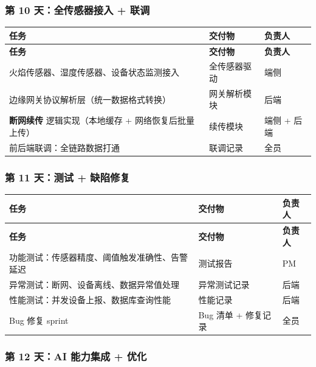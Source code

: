 \documentclass[UTF8,12pt,a4paper]{ctexart}
\begin{document}
\subsubsection{第 10 天：全传感器接入 + 联调}

\begin{longtable}{L{6cm}L{4.5cm}C{2.5cm}}
\toprule
\textbf{任务} & \textbf{交付物} & \textbf{负责人} \\
\midrule
\endfirsthead
\toprule
\textbf{任务} & \textbf{交付物} & \textbf{负责人} \\
\midrule
\endhead
\bottomrule
\endfoot

火焰传感器、湿度传感器、设备状态监测接入 & 全传感器驱动 & 端侧 \\
\midrule
边缘网关协议解析层（统一数据格式转换） & 网关解析模块 & 后端 \\
\midrule
\textbf{断网续传} 逻辑实现（本地缓存 + 网络恢复后批量上传） & 续传模块 & 端侧 + 后端 \\
\midrule
前后端联调：全链路数据打通 & 联调记录 & 全员 \\
\bottomrule
\end{longtable}

\subsubsection{第 11 天：测试 + 缺陷修复}

\begin{longtable}{L{6cm}L{4.5cm}C{2.5cm}}
\toprule
\textbf{任务} & \textbf{交付物} & \textbf{负责人} \\
\midrule
\endfirsthead
\toprule
\textbf{任务} & \textbf{交付物} & \textbf{负责人} \\
\midrule
\endhead
\bottomrule
\endfoot

功能测试：传感器精度、阈值触发准确性、告警延迟 & 测试报告 & PM \\
\midrule
异常测试：断网、设备离线、数据异常值处理 & 异常测试记录 & 后端 \\
\midrule
性能测试：并发设备上报、数据库查询性能 & 性能记录 & 后端 \\
\midrule
Bug 修复 sprint & Bug 清单 + 修复记录 & 全员 \\
\bottomrule
\end{longtable}

\subsubsection{第 12 天：AI 能力集成 + 优化}
\end{document}
